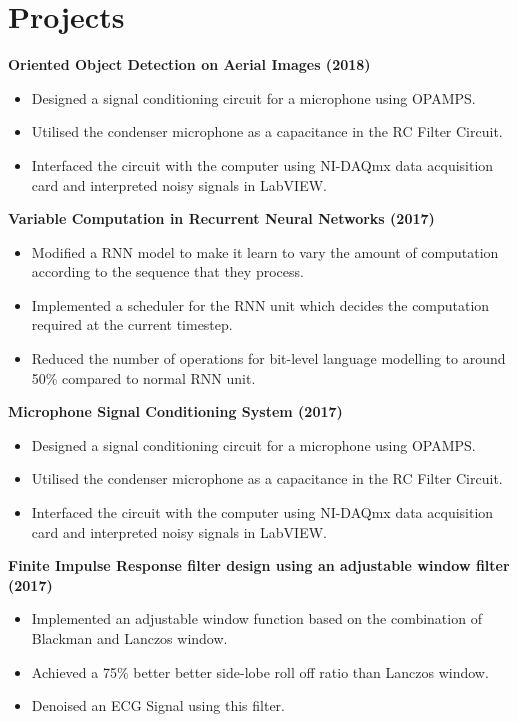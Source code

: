 \documentclass[a4paper]{article}
\newcommand{\resumeItem}[2]{
	\item\small{
		\textbf{#1}{ #2 \vspace{-5pt}}
	}
}
\newcommand{\resumeSubItem}[2]{\resumeItem{#1}{#2}\vspace{-1pt}}
\newcommand{\resumeSubItemOneArg}[1]{\item \small #1\vspace{-1pt}}
\newcommand{\resumeSubHeadingListStart}{\begin{itemize}[leftmargin=*]}
\newcommand{\resumeSubHeadingListEnd}{\end{itemize}}
\newcommand{\resumeItemListStart}{\begin{itemize} \vspace*{-5pt}}
\newcommand{\resumeItemListEnd}{\end{itemize}}
\begin{document}

\section{Projects}
\resumeSubHeadingListStart
\resumeSubItem{Oriented Object Detection on Aerial Images (2018)}{
    \resumeItemListStart
     \resumeSubItemOneArg{Designed a signal conditioning circuit for a microphone using OPAMPS.}
      \resumeSubItemOneArg{Utilised the condenser microphone as a capacitance in the RC Filter Circuit. }
      \resumeSubItemOneArg{Interfaced the circuit with the computer using NI-DAQmx data acquisition card and interpreted noisy signals in LabVIEW.}
       \resumeItemListEnd
}
\resumeSubItem{Variable Computation in Recurrent Neural Networks (2017)}{
    \resumeItemListStart
    \resumeSubItemOneArg{Modified a RNN model to make it learn to vary the amount of computation according to the sequence that they process.}
    \resumeSubItemOneArg{Implemented a scheduler for the RNN unit which decides the computation required at the current timestep.}
    \resumeSubItemOneArg{Reduced the number of operations for bit-level language modelling to around 50\% compared to normal RNN unit.}
    \resumeItemListEnd
    \vspace{-5pt}

\resumeSubItem{Microphone Signal Conditioning System (2017)}{
    \resumeItemListStart
     \resumeSubItemOneArg{Designed a signal conditioning circuit for a microphone using OPAMPS.}
      \resumeSubItemOneArg{Utilised the condenser microphone as a capacitance in the RC Filter Circuit. }
      \resumeSubItemOneArg{Interfaced the circuit with the computer using NI-DAQmx data acquisition card and interpreted noisy signals in LabVIEW.}
       \resumeItemListEnd
}
\resumeSubItem{Finite Impulse Response filter design using an adjustable window filter  (2017)}{
      \resumeItemListStart
      \resumeSubItemOneArg{Implemented an adjustable window function based on the combination of Blackman and Lanczos window.}
      \resumeSubItemOneArg{Achieved a 75\% better better side-lobe roll off ratio than Lanczos window.}
      \resumeSubItemOneArg{Denoised an ECG Signal using this filter.}
      \resumeItemListEnd
    }
}

\vspace{5pt}
\resumeSubHeadingListEnd



\end{document}
